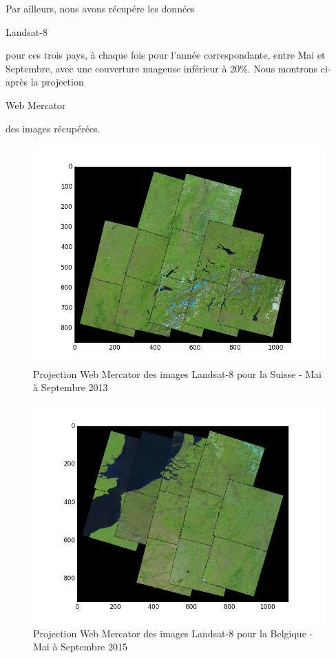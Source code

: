 \documentclass{book}
\begin{document}
   
 Par ailleurs, nous avons récupére les données \begin{itshape}Landsat-8\end{itshape} pour ces trois pays, à chaque fois pour l'année correspondante, entre Mai et Septembre, avec une couverture
 nuageuse inférieur à 20\%. Nous montrons ci-après la projection \begin{itshape}Web Mercator\end{itshape} des images récupérées.
 
 \begin{figure}[H]
 \begin{center}
 \includegraphics[scale=0.60]{../../data/Suisse/covering-selection.png}
 \caption{Projection Web Mercator des images Landsat-8 pour la Suisse - Mai à Septembre 2013}
\label{suisse_landsat}
\end{center}
\end{figure}

 \begin{figure}[H]
 \begin{center}
 \includegraphics[scale=0.60]{../../data/Belgique/covering-selection.png}
 \caption{Projection Web Mercator des images Landsat-8 pour la Belgique - Mai à Septembre 2015}
\label{belgique_landsat}
\end{center}
\end{figure}
\end{document}
